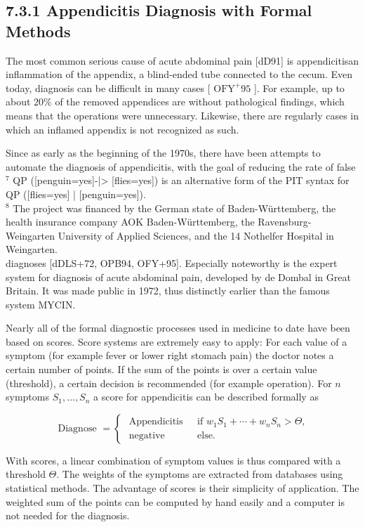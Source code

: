\documentclass[10pt]{article}
\begin{document}
\subsection*{7.3.1 Appendicitis Diagnosis with Formal Methods}
The most common serious cause of acute abdominal pain [dD91] is appendicitisan inflammation of the appendix, a blind-ended tube connected to the cecum. Even today, diagnosis can be difficult in many cases [ $\mathrm{OFY}^{+} 95$ ]. For example, up to about $20 \%$ of the removed appendices are without pathological findings, which means that the operations were unnecessary. Likewise, there are regularly cases in which an inflamed appendix is not recognized as such.

Since as early as the beginning of the 1970s, there have been attempts to automate the diagnosis of appendicitis, with the goal of reducing the rate of false\\
${ }^{7}$ QP ([penguin=yes]-|> [flies=yes]) is an alternative form of the PIT syntax for QP ([flies=yes] | [penguin=yes]).\\
${ }^{8}$ The project was financed by the German state of Baden-Württemberg, the health insurance company AOK Baden-Württemberg, the Ravensburg-Weingarten University of Applied Sciences, and the 14 Nothelfer Hospital in Weingarten.\\[0pt]
diagnoses [dDLS+72, OPB94, OFY+95]. Especially noteworthy is the expert system for diagnosis of acute abdominal pain, developed by de Dombal in Great Britain. It was made public in 1972, thus distinctly earlier than the famous system MYCIN.

Nearly all of the formal diagnostic processes used in medicine to date have been based on scores. Score systems are extremely easy to apply: For each value of a symptom (for example fever or lower right stomach pain) the doctor notes a certain number of points. If the sum of the points is over a certain value (threshold), a certain decision is recommended (for example operation). For $n$ symptoms $S_{1}, \ldots, S_{n}$ a score for appendicitis can be described formally as

$$
\text { Diagnose }= \begin{cases}\text { Appendicitis } & \text { if } w_{1} S_{1}+\cdots+w_{n} S_{n}>\Theta, \\ \text { negative } & \text { else. }\end{cases}
$$

With scores, a linear combination of symptom values is thus compared with a threshold $\Theta$. The weights of the symptoms are extracted from databases using statistical methods. The advantage of scores is their simplicity of application. The weighted sum of the points can be computed by hand easily and a computer is not needed for the diagnosis.
\end{document}
